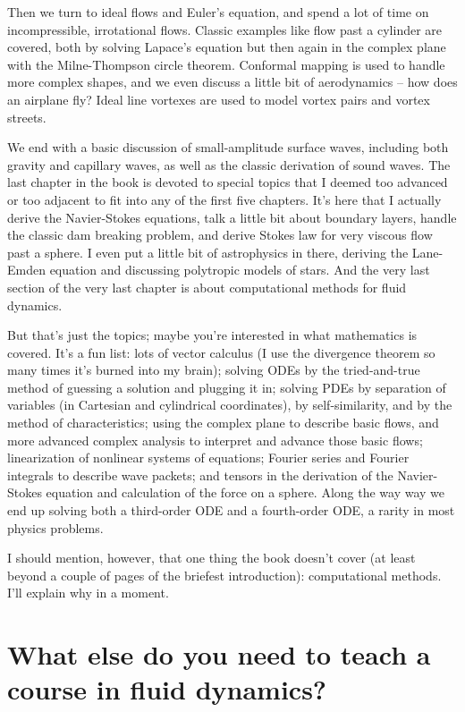 \documentclass[10pt, a5paper, twoside, openany]{memoir}
\newcounter{example}[chapter]
\newcounter{problem}[chapter]
\begin{document}
Then we turn to ideal flows and Euler's equation, and spend a lot of time on incompressible, irrotational flows.  Classic examples like flow past a cylinder are covered, both by solving Lapace's equation but then again in the complex plane with the Milne-Thompson circle theorem.  Conformal mapping is used to handle more complex shapes, and we even discuss a little bit of aerodynamics -- how does an airplane fly?  Ideal line vortexes are used to model vortex pairs and vortex streets.

We end with a basic discussion of small-amplitude surface waves, including both gravity and capillary waves, as well as the classic derivation of sound waves.  The last chapter in the book is devoted to special topics that I deemed too advanced or too adjacent to fit into any of the first five chapters.  It's here that I actually derive the Navier-Stokes equations, talk a little bit about boundary layers, handle the classic dam breaking problem, and derive Stokes law for very viscous flow past a sphere.  I even put a little bit of astrophysics in there, deriving the Lane-Emden equation and discussing polytropic models of stars.  And the very last section of the very last chapter is about computational methods for fluid dynamics.

But that's just the topics; maybe you're interested in what mathematics is covered.  It's a fun list: lots of vector calculus (I use the divergence theorem so many times it's burned into my brain); solving ODEs by the tried-and-true method of guessing a solution and plugging it in; solving PDEs by separation of variables (in Cartesian and cylindrical coordinates), by self-similarity, and by the method of characteristics; using the complex plane to describe basic flows, and more advanced complex analysis to interpret and advance those basic flows; linearization of nonlinear systems of equations; Fourier series and Fourier integrals to describe wave packets; and tensors in the derivation of the Navier-Stokes equation and calculation of the force on a sphere.  Along the way way we end up solving both a third-order ODE and a fourth-order ODE, a rarity in most physics problems.

I should mention, however, that one thing the book doesn't cover (at least beyond a couple of pages of the briefest introduction): computational methods.  I'll explain why in a moment.

\section{What else do you need to teach a course in fluid dynamics?}
\end{document}
